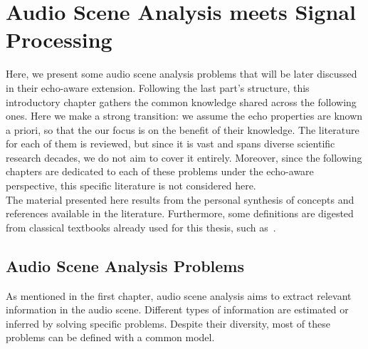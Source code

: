 \chapter{Audio Scene Analysis meets Signal Processing}\label{ch:application}

 \synopsisChApplication

\mynewline
Here, we present some audio scene analysis problems that will be later discussed in their echo-aware extension.
Following the last part's structure, this introductory chapter gathers the common knowledge shared across the following ones.
Here we make a strong transition: we assume the echo properties are known a priori, so that the our focus is on the benefit of their knowledge.
The literature for each of them is reviewed, but since it is vast and spans diverse scientific research decades, we do not aim to cover it entirely.
Moreover, since the following chapters are dedicated to each of these problems under the echo-aware perspective, this specific literature is not considered here.
\\The material presented here results from the personal synthesis of concepts and references available in the literature.
Furthermore, some definitions are digested from classical textbooks already used for this thesis, such as~.

\section{Audio Scene Analysis Problems}\label{sec:application:scenario}
As mentioned in the first chapter, audio scene analysis aims to extract relevant information in the audio scene.
Different types of information are estimated or inferred by solving specific problems.
Despite their diversity, most of these problems can be defined with a common model.

